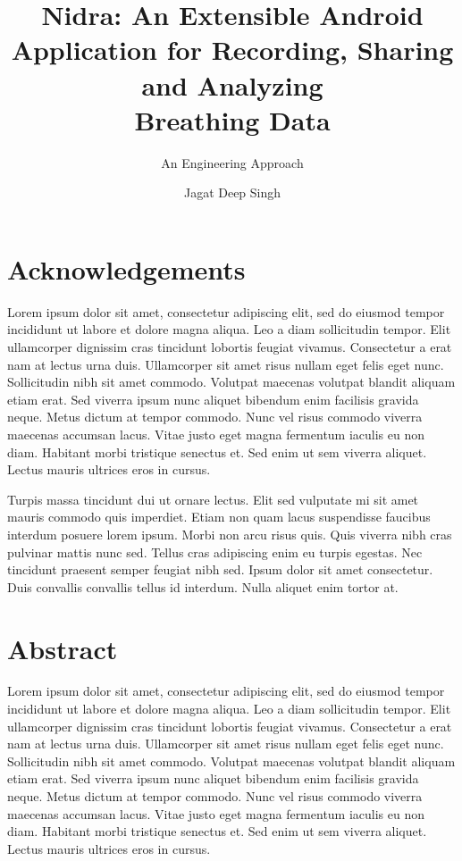 \documentclass[UKenglish]{ifimaster}  %
\title{Nidra: An Extensible Android Application for Recording, Sharing and Analyzing \\ Breathing Data}
\subtitle{An Engineering Approach}
\author{Jagat Deep Singh}
\begin{document}
\duoforside[dept={Department of Informatics},   %
  program={Programming and Networks},  %
  long]                                        %

\frontmatter{}
\chapter*{Acknowledgements}
    Lorem ipsum dolor sit amet, consectetur adipiscing elit, sed do eiusmod tempor incididunt ut labore et dolore magna aliqua. Leo a diam sollicitudin tempor. Elit ullamcorper dignissim cras tincidunt lobortis feugiat vivamus. Consectetur a erat nam at lectus urna duis. Ullamcorper sit amet risus nullam eget felis eget nunc. Sollicitudin nibh sit amet commodo. Volutpat maecenas volutpat blandit aliquam etiam erat. Sed viverra ipsum nunc aliquet bibendum enim facilisis gravida neque. Metus dictum at tempor commodo. Nunc vel risus commodo viverra maecenas accumsan lacus. Vitae justo eget magna fermentum iaculis eu non diam. Habitant morbi tristique senectus et. Sed enim ut sem viverra aliquet. Lectus mauris ultrices eros in cursus.

    Turpis massa tincidunt dui ut ornare lectus. Elit sed vulputate mi sit amet mauris commodo quis imperdiet. Etiam non quam lacus suspendisse faucibus interdum posuere lorem ipsum. Morbi non arcu risus quis. Quis viverra nibh cras pulvinar mattis nunc sed. Tellus cras adipiscing enim eu turpis egestas. Nec tincidunt praesent semper feugiat nibh sed. Ipsum dolor sit amet consectetur. Duis convallis convallis tellus id interdum. Nulla aliquet enim tortor at.

\chapter*{Abstract}
    Lorem ipsum dolor sit amet, consectetur adipiscing elit, sed do eiusmod tempor incididunt ut labore et dolore magna aliqua. Leo a diam sollicitudin tempor. Elit ullamcorper dignissim cras tincidunt lobortis feugiat vivamus. Consectetur a erat nam at lectus urna duis. Ullamcorper sit amet risus nullam eget felis eget nunc. Sollicitudin nibh sit amet commodo. Volutpat maecenas volutpat blandit aliquam etiam erat. Sed viverra ipsum nunc aliquet bibendum enim facilisis gravida neque. Metus dictum at tempor commodo. Nunc vel risus commodo viverra maecenas accumsan lacus. Vitae justo eget magna fermentum iaculis eu non diam. Habitant morbi tristique senectus et. Sed enim ut sem viverra aliquet. Lectus mauris ultrices eros in cursus.
\end{document}
